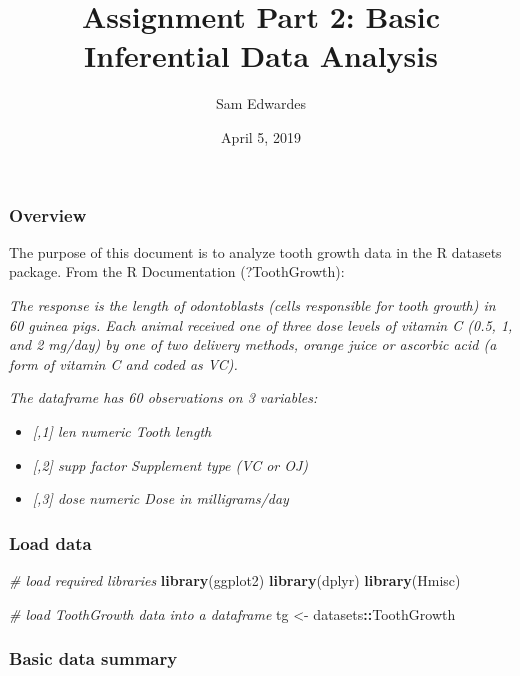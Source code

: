 \documentclass[]{article}
\title{Assignment Part 2: Basic Inferential Data Analysis}
\author{Sam Edwardes}
\date{April 5, 2019}
\newenvironment{Shaded}{\begin{snugshade}}{\end{snugshade}}
\newcommand{\CommentTok}[1]{\textcolor[rgb]{0.56,0.35,0.01}{\textit{#1}}}
\newcommand{\KeywordTok}[1]{\textcolor[rgb]{0.13,0.29,0.53}{\textbf{#1}}}
\newcommand{\NormalTok}[1]{#1}
\newcommand{\OperatorTok}[1]{\textcolor[rgb]{0.81,0.36,0.00}{\textbf{#1}}}
\newcommand{\StringTok}[1]{\textcolor[rgb]{0.31,0.60,0.02}{#1}}
\providecommand{\tightlist}{%
  \setlength{\itemsep}{0pt}\setlength{\parskip}{0pt}}
\begin{document}
\maketitle

\hypertarget{overview}{%
\subsubsection{Overview}\label{overview}}

The purpose of this document is to analyze tooth growth data in the R
datasets package. From the R Documentation (?ToothGrowth):

\emph{The response is the length of odontoblasts (cells responsible for
tooth growth) in 60 guinea pigs. Each animal received one of three dose
levels of vitamin C (0.5, 1, and 2 mg/day) by one of two delivery
methods, orange juice or ascorbic acid (a form of vitamin C and coded as
VC).}

\emph{The dataframe has 60 observations on 3 variables:}

\begin{itemize}
\tightlist
\item
  \emph{{[},1{]} len numeric Tooth length}
\item
  \emph{{[},2{]} supp factor Supplement type (VC or OJ)}
\item
  \emph{{[},3{]} dose numeric Dose in milligrams/day}
\end{itemize}

\hypertarget{load-data}{%
\subsubsection{Load data}\label{load-data}}

\begin{Shaded}
\begin{Highlighting}[]
\CommentTok{# load required libraries}
\KeywordTok{library}\NormalTok{(ggplot2)}
\KeywordTok{library}\NormalTok{(dplyr)}
\KeywordTok{library}\NormalTok{(Hmisc)}

\CommentTok{# load ToothGrowth data into a dataframe}
\NormalTok{tg <-}\StringTok{ }\NormalTok{datasets}\OperatorTok{::}\NormalTok{ToothGrowth}
\end{Highlighting}
\end{Shaded}

\hypertarget{basic-data-summary}{%
\subsubsection{Basic data summary}\label{basic-data-summary}}
\end{document}
